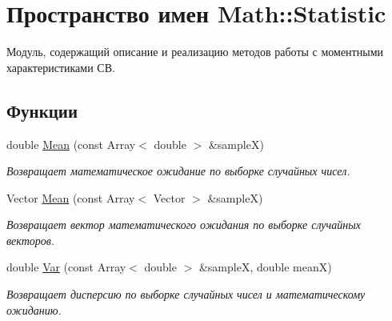 \hypertarget{namespace_math_1_1_statistic}{}\section{Пространство имен Math\+:\+:Statistic}
\label{namespace_math_1_1_statistic}


Модуль, содержащий описание и реализацию методов работы с моментными характеристиками СВ.  


\subsection*{Функции}
\begin{DoxyCompactItemize}
\item 
\hypertarget{namespace_math_1_1_statistic_a6cc81f7b570cb75924f0c4baf46181ee}{}\label{namespace_math_1_1_statistic_a6cc81f7b570cb75924f0c4baf46181ee} 
double \hyperlink{namespace_math_1_1_statistic_a6cc81f7b570cb75924f0c4baf46181ee}{Mean} (const Array$<$ double $>$ \&sampleX)
\begin{DoxyCompactList}\small\item\em Возвращает математическое ожидание по выборке случайных чисел. \end{DoxyCompactList}\item 
\hypertarget{namespace_math_1_1_statistic_aed3f3d054a2aa64bf15cd3694d087ef7}{}\label{namespace_math_1_1_statistic_aed3f3d054a2aa64bf15cd3694d087ef7} 
Vector \hyperlink{namespace_math_1_1_statistic_aed3f3d054a2aa64bf15cd3694d087ef7}{Mean} (const Array$<$ Vector $>$ \&sampleX)
\begin{DoxyCompactList}\small\item\em Возвращает вектор математического ожидания по выборке случайных векторов. \end{DoxyCompactList}\item 
\hypertarget{namespace_math_1_1_statistic_a456a80dd9114c6ee20b8c46ac6e73537}{}\label{namespace_math_1_1_statistic_a456a80dd9114c6ee20b8c46ac6e73537} 
double \hyperlink{namespace_math_1_1_statistic_a456a80dd9114c6ee20b8c46ac6e73537}{Var} (const Array$<$ double $>$ \&sampleX, double meanX)
\begin{DoxyCompactList}\small\item\em Возвращает дисперсию по выборке случайных чисел и математическому ожиданию. \end{DoxyCompactList}\item 
\hypertarget{namespace_math_1_1_statistic_a4fa57184d4396f0f85cf07d8d1f80d19}{}\label{namespace_math_1_1_statistic_a4fa57184d4396f0f85cf07d8d1f80d19} 

\end{DoxyCompactItemize}
